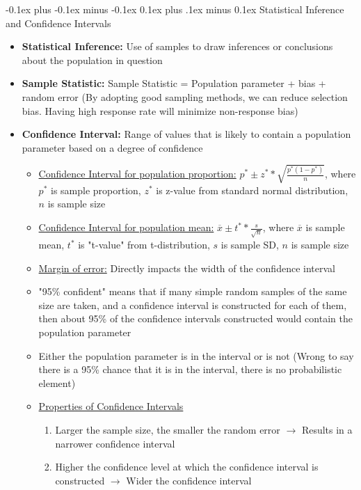 \documentclass[landscape]{article}
\makeatletter
\renewcommand{\subsection}{\@startsection{subsection}{2}{0mm}%
  {-0.1ex plus -0.1ex minus -0.1ex}%
  {0.1ex plus .1ex minus 0.1ex}%
{\normalfont\scriptsize\bfseries}}
\makeatother
\begin{document}
\begin{multicols*}{5}
    \subsection{Statistical Inference and Confidence Intervals}
    \begin{itemize}
      \item \textbf{Statistical Inference:} Use of samples to draw inferences or conclusions about the population in question
      \item \textbf{Sample Statistic:} Sample Statistic = Population parameter + bias + random error (By adopting good sampling methods, we can reduce selection bias. Having high response rate will minimize non-response bias)
      \item \textbf{Confidence Interval:} Range of values that is likely to contain a population parameter based on a degree of confidence
      \begin{itemize}
        \item \underline{Confidence Interval for population proportion:} $p^* \pm z^* * \sqrt{\frac{p^*(1-p^*)}{n}}$, where $p^*$ is sample proportion, $z^*$ is z-value from standard normal distribution, $n$ is sample size
        \item \underline{Confidence Interval for population mean:} $\overline{x} \pm t^* * \frac{s}{\sqrt{n}}$, where $\overline{x}$ is sample mean, $t^*$ is "t-value" from t-distribution, $s$ is sample SD, $n$ is sample size 
        \item \underline{Margin of error:} Directly impacts the width of the confidence interval
        \item "95\% confident" means that if many simple random samples of the same size are taken, and a confidence interval is constructed for each of them, then about 95\% of the confidence intervals constructed would contain the population parameter
        \item Either the population parameter is in the interval or is not (Wrong to say there is a 95\% chance that it is in the interval, there is no probabilistic element)
        \item \underline{Properties of Confidence Intervals}
        \begin{enumerate}
          \item Larger the sample size, the smaller the random error $\rightarrow$ Results in a narrower confidence interval
          \item Higher the confidence level at which the confidence interval is constructed $\rightarrow$ Wider the confidence interval
        \end{enumerate}
      \end{itemize}
    \end{itemize}


\end{multicols*}
\end{document}
